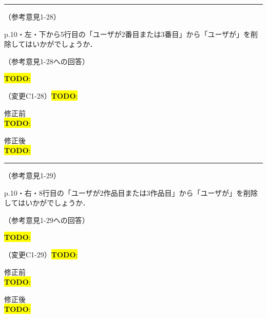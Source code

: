 \documentclass{jarticle} %
\newcommand{\todo}[1]{\colorbox{yellow}{{\bf TODO}:}{\color{blue}{\textbf{[#1]}}}}
\def\subsection#1{ \vspace{1pc} {\gt #1} }
\def\nextans{ \vspace{2pc} \hrule }
\begin{document}
\newpage
\nextans
\subsection{（参考意見1-28）}

p.10・左・下から5行目の「ユーザが2番目または3番目」から「ユーザが」を削除してはいかがでしょうか．

\subsection{（参考意見1-28への回答）}

\todo{hoge}

\subsection{（変更C1-28）\todo{hoge}}
\vspace{-0.3cm}
\begin{description}
\item 修正前\\
\phantom{　}
\todo{hoge}
\vspace{-0.3cm}
\item 修正後\\
\phantom{　}
\todo{hoge}
\end{description}

\newpage
\nextans
\subsection{（参考意見1-29）}

p.10・右・8行目の「ユーザが2作品目または3作品目」から「ユーザが」を削除してはいかがでしょうか．

\subsection{（参考意見1-29への回答）}

\todo{hoge}

\subsection{（変更C1-29）\todo{hoge}}
\vspace{-0.3cm}
\begin{description}
\item 修正前\\
\phantom{　}
\todo{hoge}
\vspace{-0.3cm}
\item 修正後\\
\phantom{　}
\todo{hoge}
\end{description}
\end{document}
